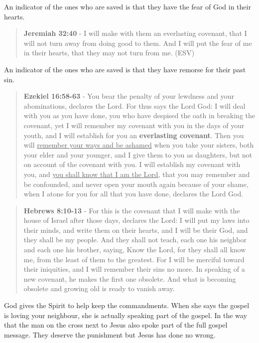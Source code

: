 \documentclass[11pt]{article}
\begin{document}
An indicator of the ones who are saved is that they have the fear of God in their hearts.

\begin{quote}
\textbf{Jeremiah 32:40} - I will make with them an everlasting covenant, that I will not turn away from doing good to them. And I will put the fear of me in their hearts, that they may not turn from me. (ESV)
\end{quote}

An indicator of the ones who are saved is that they have remorse for their past sin.

\begin{quote}
\textbf{Ezekiel 16:58-63} - You bear the penalty of your lewdness and your abominations, declares the Lord.  For thus says the Lord God: I will deal with you as you have done, you who have despised the oath in breaking the covenant, yet I will remember my covenant with you in the days of your youth, and I will establish for you an \textbf{everlasting covenant}.  Then you will \uline{remember your ways and be ashamed} when you take your sisters, both your elder and your younger, and I give them to you as daughters, but not on account of the covenant with you.  I will establish my covenant with you, and \uline{you shall know that I am the Lord}, that you may remember and be confounded, and never open your mouth again because of your shame, when I atone for you for all that you have done, declares the Lord God.
\end{quote}

\begin{quote}
\textbf{Hebrews 8:10-13} - For this is the covenant that I will make with the house of Israel after those days, declares the Lord: I will put my laws into their minds, and write them on their hearts, and I will be their God, and they shall be my people. And they shall not teach, each one his neighbor and each one his brother, saying, Know the Lord, for they shall all know me, from the least of them to the greatest. For I will be merciful toward their iniquities, and I will remember their sins no more. In speaking of a new covenant, he makes the first one obsolete. And what is becoming obsolete and growing old is ready to vanish away.
\end{quote}

God gives the Spirit to help keep the commandments. When she says the gospel is loving your neighbour, she is actually speaking part of the gospel. In the way that the man on the cross next to Jesus also spoke part of the full gospel message. They deserve the punishment but Jesus has done no wrong.
\end{document}
